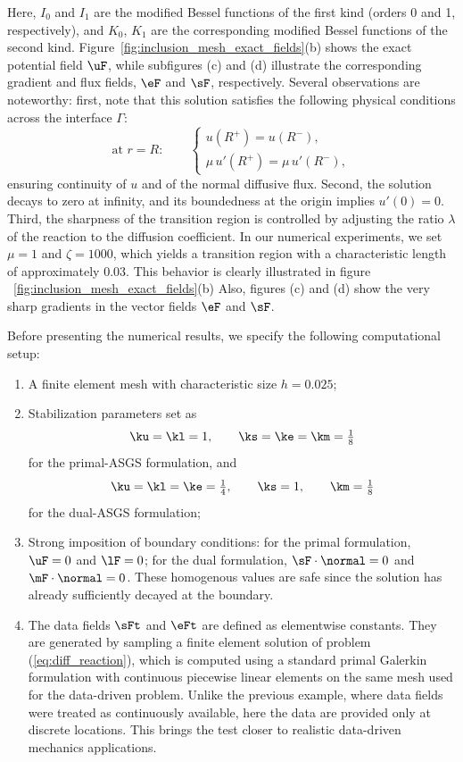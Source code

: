 Here, $I_{0}$ and $I_{1}$ are the modified Bessel functions of the first kind (orders 0 and 1, respectively), and $K_{0}$, $K_{1}$ are the corresponding modified Bessel functions of the second kind. Figure~\ref{fig:inclusion_mesh_exact_fields}(b) shows the exact potential field $\uF$, while subfigures (c) and (d) illustrate the corresponding gradient and flux fields, $\eF$ and $\sF$, respectively. Several observations are noteworthy: first, note that this solution satisfies the following physical conditions across the interface $\Gamma$:
$$
\text{at } r=R:\qquad
\begin{cases}
	u(R^{+}) = u(R^{-}), \\[3pt]
	\mu\,u'(R^{+}) = \mu\,u'(R^{-}),
\end{cases}
$$
ensuring continuity of $u$ and of the normal diffusive flux. 
Second, the solution decays to zero at infinity, and its boundedness at the origin implies $u'(0) = 0$. Third, the sharpness of the transition region is controlled by adjusting the ratio $\lambda$ of the reaction to the diffusion coefficient. In our numerical experiments, we set $\mu = 1$ and $\zeta = 1000$, which yields a transition region with a characteristic length of approximately $0.03$. This behavior is clearly illustrated in figure ~\ref{fig:inclusion_mesh_exact_fields}(b) Also, figures (c) and (d) show the very sharp gradients in the vector fields $\eF$ and $\sF$.

Before presenting the numerical results, we specify the following computational setup:
\begin{enumerate}
\item[(i)] A finite element mesh with characteristic size $h = 0.025$;
\item[(ii)] Stabilization parameters set as
\[
\ku = \kl = 1, \qquad \ks = \ke = \km = \tfrac{1}{8}
\]
for the primal-ASGS formulation, and
\[
\ku = \kl = \ke = \tfrac{1}{4}, \qquad \ks = 1, \qquad \km = \tfrac{1}{8}
\]
for the dual-ASGS formulation;

\item[(iii)] Strong imposition of boundary conditions: for the primal formulation, $\uF = 0$ and $\lF = 0$; for the dual formulation, $\sF \cdot \normal = 0$ and $\mF \cdot \normal = 0$. These
homogenous values are safe since the solution has already sufficiently decayed at the boundary.

\item[(iv)] The data fields $\sFt$ and $\eFt$ are defined as elementwise constants. 
They are generated by sampling a finite element solution of problem (\ref{eq:diff_reaction}),
which is computed using a standard primal Galerkin formulation with continuous piecewise
linear elements on the same mesh used for the data-driven problem. Unlike the previous example, 
where data fields were treated as continuously available, here the data are provided only at
discrete locations. This brings the test closer to realistic data-driven mechanics applications.
\end{enumerate}


